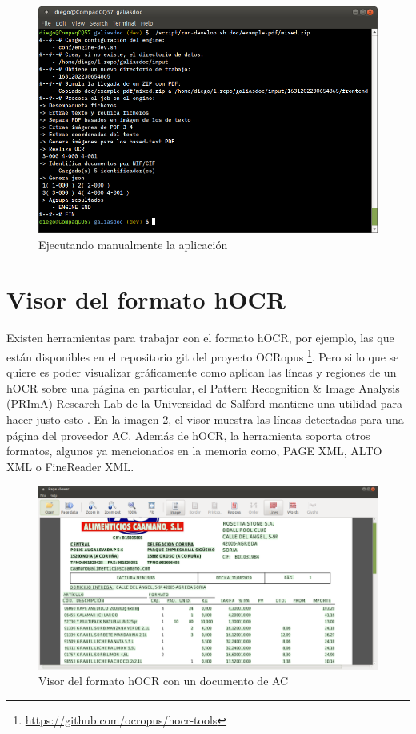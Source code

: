 \begin{figure}[hp!]
    \centering
    \includegraphics[width=1.0\textwidth]{imaxes/z-adicional/run-develop}
    \caption{Ejecutando manualmente la aplicación}
    \label{fig:ejecucion-manual}
\end{figure}

\section{Visor del formato hOCR}

Existen herramientas para trabajar con el formato hOCR, por ejemplo, las que están disponibles en el repositorio git del proyecto OCRopus \footnote{\url{https://github.com/ocropus/hocr-tools}}. Pero si lo que se quiere es poder visualizar gráficamente como aplican las líneas y regiones de un hOCR sobre una página en particular, el Pattern Recognition \& Image Analysis (PRImA) Research Lab de la Universidad de Salford mantiene una utilidad para hacer justo esto \cite{prima_tool_page_viewer}. En la imagen \ref{fig:visor-formato-hocr}, el visor muestra las líneas detectadas para una página del proveedor AC. Además de hOCR, la herramienta soporta otros formatos, algunos ya mencionados en la memoria como, PAGE XML, ALTO XML o FineReader XML.

\begin{figure}[hp!]
    \centering
    \includegraphics[width=1.0\textwidth]{imaxes/z-adicional/visor-hocr.png}
    \caption{Visor del formato hOCR con un documento de AC}
    \label{fig:visor-formato-hocr}
\end{figure}

